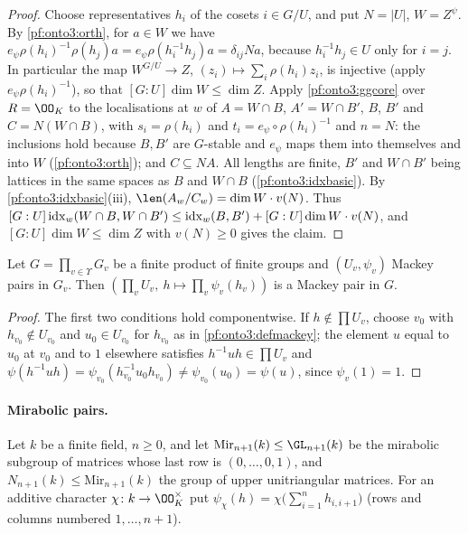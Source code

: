\begin{proof}
Choose representatives $h_i$ of the cosets $i\in G/U$, and put $N=|U|$, $W=Z^\psi$. By \cref{pf:onto3:orth},
for $a\in W$ we have $e_\psi\rho(h_i)^{-1}\rho(h_j)a=e_\psi\rho(h_i^{-1}h_j)a=\delta_{ij}Na$, because
$h_i^{-1}h_j\in U$ only for $i=j$. In particular the map $W^{G/U}\to Z$, $(z_i)\mapsto\sum_i\rho(h_i)z_i$, is
injective (apply $e_\psi\rho(h_i)^{-1}$), so that $[G:U]\dim W\le\dim Z$.
Apply \cref{pf:onto3:ggcore} over $R=\OO_K$ to the localisations at $w$ of $A=W\cap B$, $A'=W\cap B'$,
$B$, $B'$ and $C=N(W\cap B)$, with $s_i=\rho(h_i)$ and $t_i=e_\psi\circ\rho(h_i)^{-1}$ and $n=N$: the inclusions
hold because $B,B'$ are $G$-stable and $e_\psi$ maps them into themselves and into $W$
(\cref{pf:onto3:orth}); and $C\subseteq NA$. All lengths are finite, $B'$ and $W\cap B'$ being lattices in the
same spaces as $B$ and $W\cap B$ (\cref{pf:onto3:idxbasic}). By \cref{pf:onto3:idxbasic}(iii),
$\len(A_w/C_w)=\dim W\cdot v(N)$. Thus
$[G:U]\operatorname{idx}_w(W\cap B,W\cap B')\le\operatorname{idx}_w(B,B')+[G:U]\dim W\cdot v(N)$, and $[G:U]\dim W\le\dim
Z$ with $v(N)\ge0$ gives the claim.
\end{proof}

\begin{lemma}\label{pf:onto3:mackeyprod}
Let $G=\prod_{v\in\Upsilon}G_v$ be a finite product of finite groups and $(U_v,\psi_v)$ Mackey pairs in $G_v$.
Then $(\prod_vU_v,\ h\mapsto\prod_v\psi_v(h_v))$ is a Mackey pair in $G$.
\end{lemma}

\begin{proof}
The first two conditions hold componentwise. If $h\notin\prod U_v$, choose $v_0$ with $h_{v_0}\notin U_{v_0}$ and
$u_0\in U_{v_0}$ for $h_{v_0}$ as in \cref{pf:onto3:defmackey}; the element $u$ equal to $u_0$ at $v_0$ and to $1$
elsewhere satisfies $h^{-1}uh\in\prod U_v$ and $\psi(h^{-1}uh)=\psi_{v_0}(h_{v_0}^{-1}u_0h_{v_0})\ne
\psi_{v_0}(u_0)=\psi(u)$, since $\psi_v(1)=1$.
\end{proof}

\paragraph{Mirabolic pairs.}
Let $k$ be a finite field, $n\ge0$, and let $\mathrm{Mir}_{n+1}(k)\le\GL_{n+1}(k)$ be the mirabolic subgroup of
matrices whose last row is $(0,\dots,0,1)$, and $N_{n+1}(k)\le\mathrm{Mir}_{n+1}(k)$ the group of upper
unitriangular matrices. For an additive character $\chi\colon k\to\OO_K^\times$ put
$\psi_\chi(h)=\chi\bigl(\sum_{i=1}^{n}h_{i,i+1}\bigr)$ (rows and columns numbered $1,\dots,n+1$).


